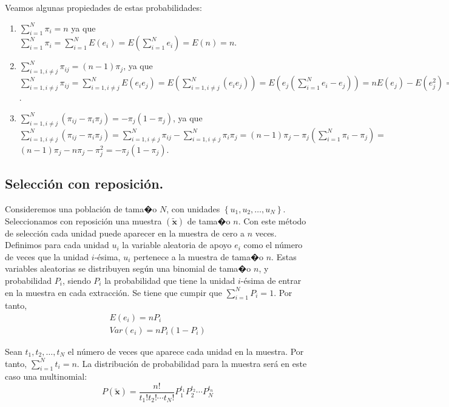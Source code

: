Veamos algunas propiedades de estas probabilidades:
\begin{enumerate}
\item $\sum_{i=1}^{N}\pi_{i}=n$ ya que $\sum_{i=1}^{N}\pi_{i}=\sum_{i=1}^{N}E\left(e_{i}\right)=E\left(\sum_{i=1}^{N}e_{i}\right)=E\left(n\right)=n$.
\item $\sum_{i=1,i\neq j}^{N}\pi_{ij}=\left(n-1\right)\pi_{j}$, ya que
$\sum_{i=1,i\neq j}^{N}\pi_{ij}=\sum_{i=1,i\neq j}^{N}E\left(e_{i}e_{j}\right)=E\left(\sum_{i=1,i\neq j}^{N}\left(e_{i}e_{j}\right)\right)=E\left(e_{j}\left(\sum_{i=1}^{N}e_{i}-e_{j}\right)\right)=nE\left(e_{j}\right)-E\left(e_{j}^{2}\right)=\left(n-1\right)\pi_{j}$.
\item $\sum_{i=1,i\neq j}^{N}\left(\pi_{ij}-\pi_{i}\pi_{j}\right)=-\pi_{j}\left(1-\pi_{j}\right)$,
ya que $\sum_{i=1,i\neq j}^{N}\left(\pi_{ij}-\pi_{i}\pi_{j}\right)=\sum_{i=1,i\neq j}^{N}\pi_{ij}-\sum_{i=1,i\neq j}^{N}\pi_{i}\pi_{j}=\left(n-1\right)\pi_{j}-\pi_{j}\left(\sum_{i=1}^{N}\pi_{i}-\pi_{j}\right)=$
$\left(n-1\right)\pi_{j}-n\pi_{j}-\pi_{j}^{2}=-\pi_{j}\left(1-\pi_{j}\right)$.
\end{enumerate}

\subsection{Selecci\'on con reposici\'on.}

Consideremos una poblaci\'on de tama�o $N$, con unidades $\left\{ u_{1},u_{2},\ldots,u_{N}\right\} $.
Seleccionamos con reposici\'on una muestra $\left(\tilde{\boldsymbol{x}}\right)$
de tama�o $n$. Con este m\'etodo de selecci\'on cada unidad puede aparecer
en la muestra de cero a $n$ veces. Definimos para cada unidad $u_{i}$
la variable aleatoria de apoyo $e_{i}$ como el n\'umero de veces que
la unidad $i$-\'esima, $u_{i}$ pertenece a la muestra de tama�o $n$.
Estas variables aleatorias se distribuyen seg\'un una binomial de tama�o
$n$, y probabilidad $P_{i}$, siendo $P_{i}$ la probabilidad que
tiene la unidad $i$-\'esima de entrar en la muestra en cada extracci\'on.
Se tiene que cumpir que $\sum_{i=1}^{N}P_{i}=1$. Por tanto, 
\[
\begin{array}{c}
E\left(e_{i}\right)=nP_{i}\\
Var\left(e_{i}\right)=nP_{i}\left(1-P_{i}\right)
\end{array}
\]


Sean $t_{1},t_{2},\ldots,t_{N}$ el n\'umero de veces que aparece cada
unidad en la muestra. Por tanto, $\sum_{i=1}^{N}t_{i}=n$. La distribuci\'on
de probabilidad para la muestra ser\'a en este caso una multinomial:
\[
P\left(\tilde{\boldsymbol{x}}\right)=\dfrac{n!}{t_{1}!t_{2}!\cdots t_{N}!}P_{1}^{t_{1}}P_{2}^{t_{2}}\cdots P_{N}^{t_{n}}
\]



